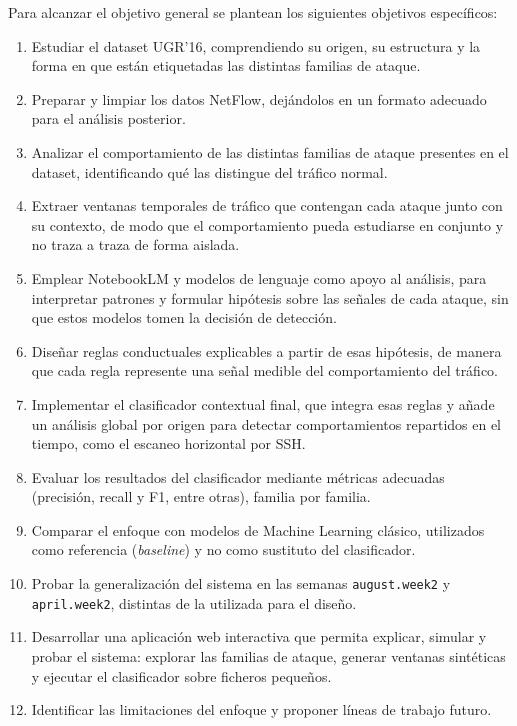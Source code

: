 Para alcanzar el objetivo general se plantean los siguientes objetivos específicos:

\begin{enumerate}
  \item Estudiar el dataset UGR'16, comprendiendo su origen, su estructura y la forma en que están etiquetadas las distintas familias de ataque.
  \item Preparar y limpiar los datos NetFlow, dejándolos en un formato adecuado para el análisis posterior.
  \item Analizar el comportamiento de las distintas familias de ataque presentes en el dataset, identificando qué las distingue del tráfico normal.
  \item Extraer ventanas temporales de tráfico que contengan cada ataque junto con su contexto, de modo que el comportamiento pueda estudiarse en conjunto y no traza a traza de forma aislada.
  \item Emplear NotebookLM y modelos de lenguaje como apoyo al análisis, para interpretar patrones y formular hipótesis sobre las señales de cada ataque, sin que estos modelos tomen la decisión de detección.
  \item Diseñar reglas conductuales explicables a partir de esas hipótesis, de manera que cada regla represente una señal medible del comportamiento del tráfico.
  \item Implementar el clasificador contextual final, que integra esas reglas y añade un análisis global por origen para detectar comportamientos repartidos en el tiempo, como el escaneo horizontal por SSH.
  \item Evaluar los resultados del clasificador mediante métricas adecuadas (precisión, recall y F1, entre otras), familia por familia.
  \item Comparar el enfoque con modelos de Machine Learning clásico, utilizados como referencia (\textit{baseline}) y no como sustituto del clasificador.
  \item Probar la generalización del sistema en las semanas \texttt{august.week2} y \texttt{april.week2}, distintas de la utilizada para el diseño.
  \item Desarrollar una aplicación web interactiva que permita explicar, simular y probar el sistema: explorar las familias de ataque, generar ventanas sintéticas y ejecutar el clasificador sobre ficheros pequeños.
  \item Identificar las limitaciones del enfoque y proponer líneas de trabajo futuro.
\end{enumerate}

